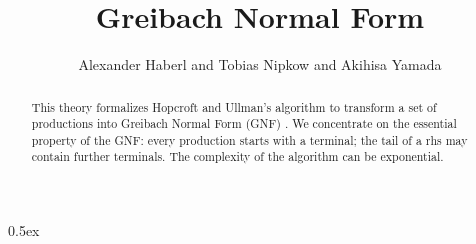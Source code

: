 \documentclass[11pt,a4paper]{article}
\begin{document}
\title{Greibach Normal Form}
\author{Alexander Haberl and Tobias Nipkow and Akihisa Yamada}
\maketitle

\begin{abstract}
  This theory formalizes Hopcroft and Ullman's algorithm
  \cite{HopcroftU79} to transform a set of productions into Greibach
  Normal Form (GNF) \cite{Greibach}. We concentrate on the essential
  property of the GNF: every production starts with a terminal; the
  tail of a rhs may contain further terminals.  The complexity of the
  algorithm can be exponential.
\end{abstract}

\parindent 0pt\parskip 0.5ex





\end{document}
